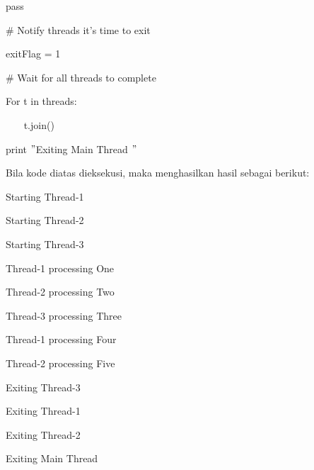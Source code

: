 \documentclass{wileySix}
\begin{document}
\noindent 
{\fontsize{10pt}{10pt}\selectfont pass} \par
\vspace{10pt}
\noindent 
{\fontsize{10pt}{10pt}\selectfont  $  \#  $ Notify threads it’s time to exit} \par
\noindent 
{\fontsize{10pt}{10pt}\selectfont exitFlag = 1} \par
\vspace{10pt}
\noindent 
{\fontsize{10pt}{10pt}\selectfont  $  \#  $ Wait for all threads to complete} \par
\noindent 
{\fontsize{10pt}{10pt}\selectfont For t in threads:} \par
\noindent 
{\fontsize{10pt}{10pt}\selectfont ~~~ t.join()} \par
\noindent 
{\fontsize{10pt}{10pt}\selectfont print  $ " $Exiting Main Thread $ " $} \par
\vspace{10pt}
\noindent 
Bila kode diatas dieksekusi, maka menghasilkan hasil sebagai berikut: \par
\vspace{12pt}
\noindent 
{\fontsize{10pt}{10pt}\selectfont Starting Thread-1} \par
\noindent 
{\fontsize{10pt}{10pt}\selectfont Starting Thread-2} \par
\noindent 
{\fontsize{10pt}{10pt}\selectfont Starting Thread-3} \par
\noindent 
{\fontsize{10pt}{10pt}\selectfont Thread-1 processing One} \par
\noindent 
{\fontsize{10pt}{10pt}\selectfont Thread-2 processing Two} \par
\noindent 
{\fontsize{10pt}{10pt}\selectfont Thread-3 processing Three} \par
\noindent 
{\fontsize{10pt}{10pt}\selectfont Thread-1 processing Four} \par
\noindent 
{\fontsize{10pt}{10pt}\selectfont Thread-2 processing Five} \par
\noindent 
{\fontsize{10pt}{10pt}\selectfont Exiting Thread-3} \par
\noindent 
{\fontsize{10pt}{10pt}\selectfont Exiting Thread-1} \par
\noindent 
{\fontsize{10pt}{10pt}\selectfont Exiting Thread-2} \par
\noindent 
{\fontsize{10pt}{10pt}\selectfont Exiting Main Thread} \par
\noindent 
\vspace{40pt}
\end{document}
